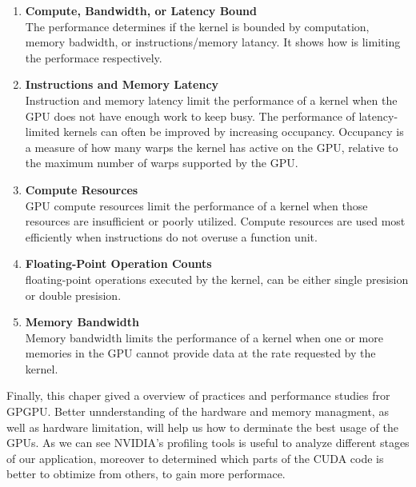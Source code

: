 \begin{enumerate}
  \item \textbf{Compute, Bandwidth, or Latency Bound} \hfill \\
      The performance determines if the kernel is bounded by computation, memory badwidth, or instructions/memory latancy. It shows how is limiting the performace respectively.
  
  \item \textbf{Instructions and Memory Latency} \hfill \\
Instruction and memory latency limit the performance of a kernel when the GPU does not have enough work to keep busy. The performance of latency-limited kernels can often be improved by increasing occupancy. Occupancy is a measure of how many warps the kernel has active on the GPU, relative to the maximum number of warps supported by the GPU.
  
  \item \textbf{Compute Resources} \hfill \\
GPU compute resources limit the performance of a kernel when those resources are insufficient or poorly utilized. Compute resources are used most efficiently when instructions do not overuse a function unit. 
  \item \textbf{Floating-Point Operation Counts} \hfill \\
  floating-point operations executed by the kernel, can be either single presision or double presision.
  
  \item \textbf{Memory Bandwidth} \hfill \\
  Memory bandwidth limits the performance of a kernel when one or more memories in the GPU cannot provide data at the rate requested by the kernel.
\end{enumerate}

\vspace{3.5em}

Finally, this chaper gived a overview of practices and performance studies fror GPGPU. Better unnderstanding of the hardware and memory managment, as well as hardware limitation, will help us how to derminate the best usage of the GPUs. As we can see NVIDIA's profiling tools is useful to analyze different stages of our application, moreover to determined which parts of the CUDA code is better to obtimize from others, to gain more performace.


